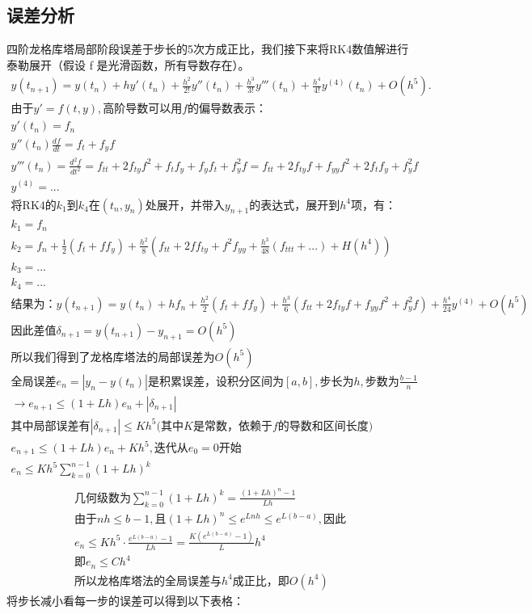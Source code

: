 \documentclass[11pt]{article}
\begin{document}
\subsection{误差分析}
四阶龙格库塔局部阶段误差于步长的5次方成正比，我们接下来将RK4数值解进行泰勒展开（假设 f 是光滑函数，所有导数存在）。
\begin{equation*}
    \begin{gathered}
        y(t_{n+1})=y(t_n)+hy'(t_n)+\frac{h^2}{2!}y''(t_n)+\frac{h^3}{3!}y'''(t_n)+\frac{h^4}{4!}y^{(4)}(t_n)+O(h^5).\\
        \mbox{由于}y'=f(t,y),\mbox{高阶导数可以用}f\mbox{的偏导数表示：}\\
        y'(t_n)=f_n\\
y''(t_n)\frac{df}{dt}=f_t+f_yf\\
y'''(t_n)=\frac{d^2f}{dt^2}=f_{tt}+2f_{ty}f^2+f_tf_y+f_yf_t+f_y^2f=f_{tt}+2f_{ty}f+f_{yy}f^2+2f_tf_y+f^2_yf\\
y^{(4)}=...\\
\mbox{将RK4的}k_1\mbox{到}k_4\mbox{在}(t_n,y_n)\mbox{处展开，并带入}y_{n+1}\mbox{的表达式，展开到}h^4\mbox{项，有：}\\
k_1=f_n\\
k_2=f_n+\frac{1}{2}(f_t+ff_y)+\frac{h^2}{8}(f_{tt}+2ff_{ty}+f^2f_{yy}+\frac{h^3}{48}(f_{ttt}+...)+H(h^4))\\
k_3=...\\
k_4=...\\
\mbox{结果为：}y(t_{n+1})=y(t_n)+hf_n+\frac{h^2}{2}(f_t+ff_y)+\frac{h^3}{6}(f_{tt}+2f_{ty}f+f_{yy}f^2+f^2_yf)+\frac{h^4}{24}y^{(4)}+O(h^5)\\
\mbox{因此差值}\delta_{n+1}=y(t_{n+1})-y_{n+1}=O(h^5)\\
\mbox{所以我们得到了龙格库塔法的局部误差为}O(h^5)\\
\mbox{全局误差}e_n=|y_n-y(t_n)|\mbox{是积累误差，设积分区间为}[a,b],\mbox{步长为}h,\mbox{步数为}\frac{b-1}{n}\\
\to e_{n+1}\leq(1+Lh)e_n+|\delta_{n+1}|\\
\mbox{其中局部误差有}|\delta_{n+1}|\leq Kh^5\mbox{(其中}K\mbox{是常数，依赖于} f \mbox{的导数和区间长度)}\\
e_{n+1}\leq(1+Lh)e_n+Kh^5,\mbox{迭代从}e_0=0\mbox{开始}\\
e_n\leq Kh^5\sum^{n-1}_{k=0}(1+Lh)^k\\
    \end{gathered}
\end{equation*}
\begin{equation*}
    \begin{gathered}
    \mbox{几何级数为}\sum^{n-1}_{k=0}(1+Lh)^k=\frac{(1+Lh)^n-1}{Lh}\\
        \mbox{由于}nh\leq b-1,\mbox{且}(1+Lh)^n\leq e^{Lnh}\leq e^{L(b-a)},\mbox{因此}\\
e_n\leq Kh^5\cdot \frac{e^{L(b-a)}-1}{Lh}=\frac{K(e^{L(b-a)}-1)}{L}h^4\\
\mbox{即}e_n\leq Ch^4\\
\mbox{所以龙格库塔法的全局误差与}h^4\mbox{成正比，即}O(h^4)
    \end{gathered}
\end{equation*}
将步长减小看每一步的误差可以得到以下表格：
\end{document}
